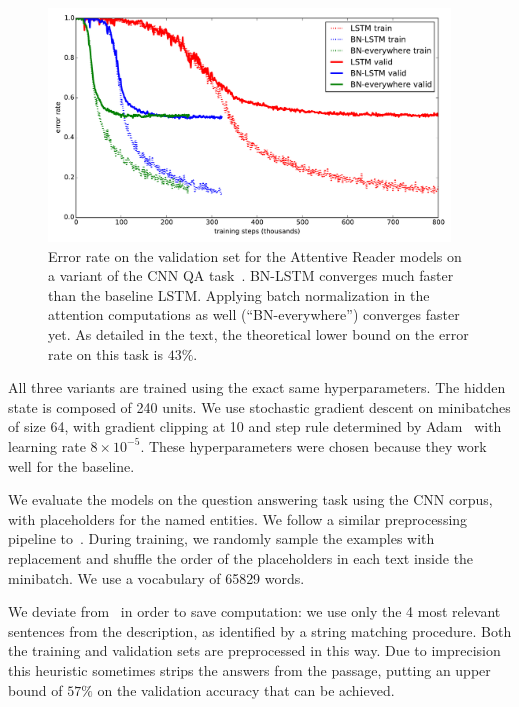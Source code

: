 \documentclass{article} %
\begin{document}
\begin{figure}[!ht]
\center
\includegraphics[width=0.95\textwidth]{figures/attr_valid.pdf}
\caption{
Error rate on the validation set for the Attentive Reader models on a variant of the CNN QA task~\cite{attentivereader}.
BN-LSTM converges much faster than the baseline LSTM.
Applying batch normalization in the attention computations as well (``BN-everywhere'') converges faster yet.
As detailed in the text, the theoretical lower bound on the error rate on this task is $43\%$.
}
\label{fig:attr_valid}
\end{figure}

All three variants are trained using the exact same hyperparameters.
The hidden state is composed of 240 units.
We use stochastic gradient descent on minibatches of size 64,
with gradient clipping at 10 and step rule determined by Adam~\cite{kingma2014adam}
with learning rate $8 \times 10^{-5}$.
These hyperparameters were chosen because they work well for the baseline.

We evaluate the models on the question answering task using the CNN corpus, with placeholders for the named entities. We follow a similar preprocessing pipeline to~\cite{attentivereader}.
During training, we randomly sample the examples with replacement and shuffle the order of the placeholders in each text inside the minibatch.
We use a vocabulary of 65829 words.

We deviate from~\cite{attentivereader} in order to save computation:
we use only the 4 most relevant sentences from the description,
as identified by a string matching procedure.
Both the training and validation sets are preprocessed in this way.
Due to imprecision this heuristic sometimes strips the answers from the passage,
putting an upper bound of $57\%$ on the validation accuracy that can be achieved.
\end{document}

